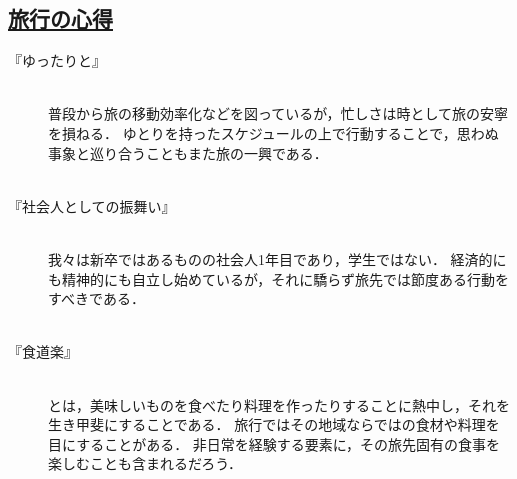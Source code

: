 \begin{center}
	\section*{\underline{\fontsize{45pt}{20pt}\selectfont 旅行の心得}}
\end{center}
\vspace{1.5cm}
\begin{description}
	\item[\huge 『ゆったりと』]\mbox{}\\
	普段から旅の移動効率化などを図っているが，忙しさは時として旅の安寧を損ねる．
	ゆとりを持ったスケジュールの上で行動することで，思わぬ事象と巡り合うこともまた旅の一興である．\\\\
	\item[\huge 『社会人としての振舞い』]\mbox{}\\
	我々は新卒ではあるものの社会人1年目であり，学生ではない．
	経済的にも精神的にも自立し始めているが，それに驕らず旅先では節度ある行動をすべきである．\\\\
	\item[\huge 『食道楽』]\mbox{}\\
	とは，美味しいものを食べたり料理を作ったりすることに熱中し，それを生き甲斐にすることである．
	旅行ではその地域ならではの食材や料理を目にすることがある．
	非日常を経験する要素に，その旅先固有の食事を楽しむことも含まれるだろう．
\end{description}